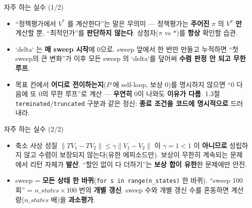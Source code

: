\documentclass[aspectratio=169,11pt]{beamer}
\begin{document}
\begin{frame}{자주 하는 실수 (1/2)}
  \begin{itemize}
    \item {} ``정책평가에서
      $V^{*}$ 를 계산한다''는 말은 무의미 --- 정책평가는
      \textbf{주어진} $\pi$ 의 $V^\pi$ \textbf{만} 계산할 뿐,
      ``최적인가''를 \textbf{판단하지 않는다}. 상첨자($\pi$ vs
      $*$)를 \textbf{항상} 확인할 습관.
    \item {} `delta`
      는 \textbf{매 sweep 시작}에 0으로. sweep 앞에서 한 번만
      만들고 누적하면 ``첫 sweep의 큰 변화''가 이후 모든 sweep
      의 `delta`를 덮어써 \textbf{수렴 판정 안 되고 무한 루프}.
    \item {} 목표 칸에서
      \textbf{어디로 전이하는지}($P$ 에 self-loop, 보상 0)를
      명시하지 않으면 ``0 다음에 또 0의 무한 루프''로 계산 ---
      \textbf{우연히} 0이 나와도 \textbf{이유가 다름}. 1.3절
      \texttt{terminated}/\texttt{truncated} 구분과 같은 정신:
      \textbf{종료 조건을 코드에 명시적으로} 드러내라.
  \end{itemize}
\end{frame}

\begin{frame}{자주 하는 실수 (2/2)}
  \begin{itemize}
    \item {} 축소 사상
      성질 $\|TV_1 - TV_2\| \le \gamma \|V_1 - V_2\|$ 이
      $\gamma = 1 < 1$ 이 \textbf{아니므로} 성립하지 않고
      수렴이 보장되지 않는다(유한 에피소드만). 보상이 무한히
      계속되는 문제에서 리턴 자체가 \textbf{발산}. ``할인 없이
      다 더하기''는 \textbf{보상 합이 유한}한 문제에만 안전.
    \item {}
      sweep = \textbf{모든 상태 한 바퀴}(\texttt{for s in
      range(n\_states)} 한 바퀴). ``sweep 100회'' =
      $n\_states \times 100$ 번의 \textbf{개별 갱신}. sweep 수와
      개별 갱신 수를 혼동하면 계산량($n\_states$ 배)을
      \textbf{과소평가}.
  \end{itemize}
\end{frame}
\end{document}
